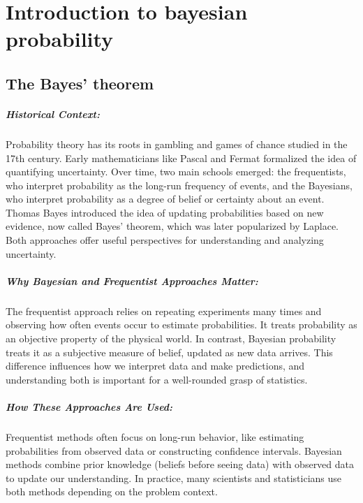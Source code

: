 \documentclass{book}
\begin{document}
\chapter{Introduction to bayesian probability}

\section{The Bayes' theorem}

\paragraph{Historical Context:}
Probability theory has its roots in gambling and games of chance studied in the 17th century. Early mathematicians like Pascal and Fermat formalized the idea of quantifying uncertainty. Over time, two main schools emerged: the frequentists, who interpret probability as the long-run frequency of events, and the Bayesians, who interpret probability as a degree of belief or certainty about an event. Thomas Bayes introduced the idea of updating probabilities based on new evidence, now called Bayes’ theorem, which was later popularized by Laplace. Both approaches offer useful perspectives for understanding and analyzing uncertainty.

\paragraph{Why Bayesian and Frequentist Approaches Matter:}
The frequentist approach relies on repeating experiments many times and observing how often events occur to estimate probabilities. It treats probability as an objective property of the physical world. In contrast, Bayesian probability treats it as a subjective measure of belief, updated as new data arrives. This difference influences how we interpret data and make predictions, and understanding both is important for a well-rounded grasp of statistics.

\paragraph{How These Approaches Are Used:}
Frequentist methods often focus on long-run behavior, like estimating probabilities from observed data or constructing confidence intervals. Bayesian methods combine prior knowledge (beliefs before seeing data) with observed data to update our understanding. In practice, many scientists and statisticians use both methods depending on the problem context.\\
\end{document}
